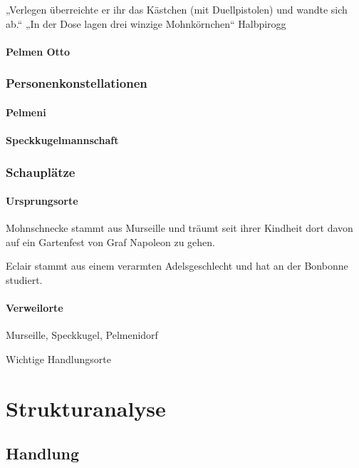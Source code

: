 „Verlegen überreichte er ihr das Kästchen (mit Duellpistolen) und wandte sich ab.“
„In der Dose lagen drei winzige Mohnkörnchen“
Halbpirogg


\subsubsection{Pelmen Otto}


\subsection {Personenkonstellationen}
\subsubsection {Pelmeni}
\subsubsection{Speckkugelmannschaft}

\subsection{Schauplätze}
\subsubsection{Ursprungsorte}
Mohnschnecke stammt aus Murseille und träumt seit ihrer Kindheit dort davon auf ein Gartenfest von Graf Napoleon zu gehen.

Eclair stammt aus einem verarmten Adelsgeschlecht und hat an der Bonbonne studiert.

\subsubsection{Verweilorte}

Murseille, Speckkugel, Pelmenidorf 

Wichtige Handlungsorte
		
\chapter{Strukturanalyse}

\section{Handlung}
